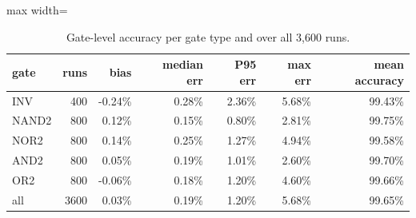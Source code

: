 \begin{table}[H]
\centering
{\small
\begin{adjustbox}{max width=\linewidth}
\begin{tabular}{lrrrrrr}
\toprule
gate & runs & bias & median err & P95 err & max err & mean accuracy \\
\midrule
INV & 400 & -0.24\% & 0.28\% & 2.36\% & 5.68\% & 99.43\% \\
NAND2 & 800 & 0.12\% & 0.15\% & 0.80\% & 2.81\% & 99.75\% \\
NOR2 & 800 & 0.14\% & 0.25\% & 1.27\% & 4.94\% & 99.58\% \\
AND2 & 800 & 0.05\% & 0.19\% & 1.01\% & 2.60\% & 99.70\% \\
OR2 & 800 & -0.06\% & 0.18\% & 1.20\% & 4.60\% & 99.66\% \\
all & 3600 & 0.03\% & 0.19\% & 1.20\% & 5.68\% & 99.65\% \\
\bottomrule
\end{tabular}
\end{adjustbox}
}
\caption{Gate-level accuracy per gate type and over all 3{,}600 runs.}
\label{tab:bygate}
\end{table}

